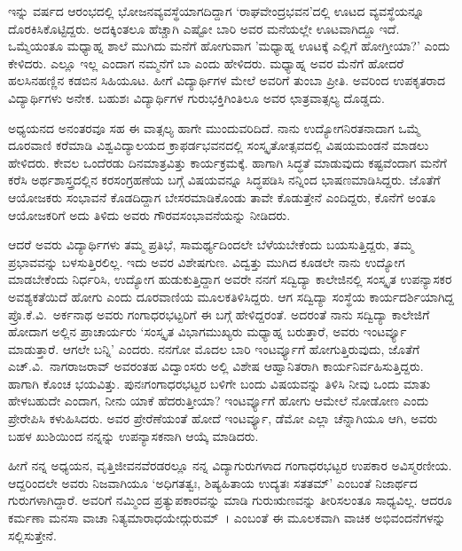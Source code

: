 {ಇನ್ನು ವರ್ಷದ ಆರಂಭದಲ್ಲಿ ಭೋಜನವ್ಯವಸ್ಥೆಯಾಗದಿದ್ದಾಗ ‘ರಾಘವೇಂದ್ರ\-ಭವನ’ದಲ್ಲಿ ಊಟದ ವ್ಯವಸ್ಥೆಯನ್ನೂ ದೊರಕಿಸಿಕೊಟ್ಟಿದ್ದರು. ಅದಕ್ಕಿಂತಲೂ ಹೆಚ್ಚಾಗಿ ಎಷ್ಟೋ ಬಾರಿ ಅವರ ಮನೆಯಲ್ಲೇ ಊಟವಾಗಿದ್ದೂ ಇದೆ. ಒಮ್ಮೆಯಂತೂ ಮಧ್ಯಾಹ್ನ ಶಾಲೆ ಮುಗಿದು ಮನೆಗೆ ಹೋಗುವಾಗ ’ಮಧ್ಯಾಹ್ನ ಊಟಕ್ಕೆ ಎಲ್ಲಿಗೆ ಹೋಗ್ತೀಯಾ?’ ಎಂದು ಕೇಳಿದರು. ಎಲ್ಲೂ ಇಲ್ಲ ಎಂದಾಗ ನಮ್ಮನೆಗೆ ಬಾ ಎಂದು ಹೇಳಿದರು. ಮಧ್ಯಾಹ್ನ ಅವರ ಮೆನೆಗೆ ಹೋದರೆ ಹಲಸಿನಹಣ್ಣಿನ ಕಡಬಿನ ಸಿಹಿಯೂಟ. ಹೀಗೆ ವಿದ್ಯಾರ್ಥಿಗಳ ಮೇಲೆ ಅವರಿಗೆ ತುಂಬಾ ಪ್ರೀತಿ. ಅವರಿಂದ ಉಪಕೃತರಾದ ವಿದ್ಯಾರ್ಥಿಗಳು ಅನೇಕ. ಬಹುಶಃ ವಿದ್ಯಾರ್ಥಿಗಳ ಗುರುಭಕ್ತಿಗಿಂತಿಲೂ ಅವರ ಛಾತ್ರವಾತ್ಸಲ್ಯ ದೊಡ್ಡದು.

ಅಧ್ಯಯನದ ಅನಂತರವೂ ಸಹ ಈ ವಾತ್ಸಲ್ಯ ಹಾಗೇ ಮುಂದುವರಿದಿದೆ. ನಾನು ಉದ್ಯೋಗನಿರತನಾದಾಗ ಒಮ್ಮೆ ದೂರವಾಣಿ ಕರೆಮಾಡಿ ವಿಶ್ವವಿದ್ಯಾಲಯದ ಕ್ರಾಫರ್ಡ\-ಭವನದಲ್ಲಿ ಸಂಸ್ಕೃತೋತ್ಸವದಲ್ಲಿ ವಿಷಯಮಂಡನೆ ಮಾಡಲು ಹೇಳಿದರು. ಕೇವಲ ಒಂದೆರಡು ದಿನಮಾತ್ರವಿತ್ತು ಕಾರ್ಯಕ್ರಮಕ್ಕೆ. ಹಾಗಾಗಿ ಸಿದ್ಧತೆ ಮಾಡುವುದು ಕಷ್ಟವೆಂದಾಗ ಮನೆಗೆ ಕರೆಸಿ ಅರ್ಥಶಾಸ್ತ್ರದಲ್ಲಿನ ಕರಸಂಗ್ರಹಣೆಯ ಬಗ್ಗೆ ವಿಷಯವನ್ನೂ ಸಿದ್ಧಪಡಿಸಿ ನನ್ನಿಂದ ಭಾಷಣಮಾಡಿಸಿದ್ದರು. ಜೊತೆಗೆ ಆಯೋಜಕರು ಸಂಭಾವನೆ ಕೊಡದಿದ್ದಾಗ ಬೇಸರಮಾಡಿಕೊಂಡು ತಾವೇ ಕೊಡುತ್ತೇನೆ ಎಂದಿದ್ದರು, ಕೊನೆಗೆ ಅಂತೂ ಆಯೋಜಕರಿಗೆ ಅದು ತಿಳಿದು ಅವರು ಗೌರವಸಂಭಾವನೆಯನ್ನು ನೀಡಿದರು.

ಆದರೆ ಅವರು ವಿದ್ಯಾರ್ಥಿಗಳು ತಮ್ಮ ಪ್ರತಿಭೆ, ಸಾಮರ್ಥ್ಯದಿಂದಲೇ ಬೆಳೆಯ\-ಬೇಕೆಂದು ಬಯಸುತ್ತಿದ್ದರು, ತಮ್ಮ ಪ್ರಭಾವವನ್ನು ಬಳಸುತ್ತಿರಲಿಲ್ಲ. ಇದು ಅವರ ವಿಶೇಷ\-ಗುಣ. ವಿದ್ವತ್ತು ಮುಗಿದ ಕೂಡಲೇ ನಾನು ಉದ್ಯೋಗ ಮಾಡಬೇಕೆಂದು ನಿರ್ಧರಿಸಿ, ಉದ್ಯೋಗ ಹುಡುಕುತ್ತಿದ್ದಾಗ ಅವರೇ ನನಗೆ ಸದ್ವಿದ್ಯಾ ಕಾಲೇಜಿನಲ್ಲಿ ಸಂಸ್ಕೃತ ಉಪನ್ಯಾಸಕರ ಅವಶ್ಯಕತೆಯಿದೆ ಹೋಗು ಎಂದು ದೂರವಾಣಿಯ ಮೂಲಕ\break ತಿಳಿಸಿದ್ದರು. ಆಗ ಸದ್ವಿದ್ಯಾ ಸಂಸ್ಥೆಯ ಕಾರ್ಯದರ್ಶಿಯಾಗಿದ್ದ ಪ್ರೊ.ಕೆ.ವಿ.\ ಅರ್ಕನಾಥ ಅವರು ಗಂಗಾಧರಭಟ್ಟರಿಗೆ ಈ ಬಗ್ಗೆ ಹೇಳಿದ್ದರಂತೆ. ಅದರಂತೆ ನಾನು ಸದ್ವಿದ್ಯಾ ಕಾಲೇಜಿಗೆ ಹೋದಾಗ ಅಲ್ಲಿನ ಪ್ರಾಚಾರ್ಯರು ‘ಸಂಸ್ಕೃತ ವಿಭಾಗಮುಖ್ಯರು ಮಧ್ಯಾಹ್ನ ಬರುತ್ತಾರೆ, ಅವರು ಇಂಟರ್ವ್ಯೂ ಮಾಡುತ್ತಾರೆ. ಆಗಲೇ ಬನ್ನಿ’ ಎಂದರು. ನನಗೋ ಮೊದಲ ಬಾರಿ ಇಂಟರ್ವ್ಯೂಗೆ ಹೋಗುತ್ತಿರುವುದು, ಜೊತೆಗೆ ಎಚ್.ವಿ.\ ನಾಗರಾಜರಾವ್ ಅವರಂತಹ ವಿದ್ವಾಂಸರು ಅಲ್ಲಿ ವಿಶೇಷ ಆಹ್ವಾನಿತರಾಗಿ ಕಾರ್ಯನಿರ್ವಹಿಸುತ್ತಿದ್ದರು. ಹಾಗಾಗಿ ಕೊಂಚ ಭಯವಿತ್ತು. ಪುನಃಗಂಗಾಧರಭಟ್ಟರ ಬಳಿಗೇ ಬಂದು ವಿಷಯವನ್ನು ತಿಳಿಸಿ ನೀವು ಒಂದು ಮಾತು ಹೇಳಬಹುದೇ ಎಂದಾಗ, ನೀನು ಯಾಕೆ ಹೆದರುತ್ತೀಯಾ? ಇಂಟರ್ವ್ಯೂಗೆ ಹೋಗು ಆಮೇಲೆ ನೋಡೋಣ ಎಂದು ಪ್ರೇರೇಪಿಸಿ ಕಳುಹಿಸಿದರು. ಅವರ ಪ್ರೇರೆಣೆಯಂತೆ ಹೋದೆ ಇಂಟರ್ವ್ಯೂ, ಡೆಮೋ ಎಲ್ಲಾ ಚೆನ್ನಾಗಿಯೂ ಆಗಿ, ಅವರು ಬಹಳ ಖುಶಿಯಿಂದ ನನ್ನನ್ನು ಉಪನ್ಯಾಸಕನಾಗಿ ಆಯ್ಕೆ ಮಾಡಿದರು.

ಹೀಗೆ ನನ್ನ ಅಧ್ಯಯನ, ವೃತ್ತಿಜೀವನವೆರಡರಲ್ಲೂ ನನ್ನ ವಿದ್ಯಾಗುರುಗಳಾದ ಗಂಗಾಧರಭಟ್ಟರ ಉಪಕಾರ ಅವಿಸ್ಮರಣೀಯ. ಆದ್ದರಿಂದಲೇ ಅವರು ನಿಜವಾಗಿಯೂ ‘ಅಧಿಗತತ್ವಃ, ಶಿಷ್ಯಹಿತಾಯ ಉದ್ಯತಃ ಸತತಮ್’ ಎಂಬಂತೆ ನಿಜಾರ್ಥದ ಗುರುಗಳಾಗಿದ್ದಾರೆ. ಅವರಿಗೆ ನಮ್ಮಿಂದ ಪ್ರತ್ಯುಪಕಾರವನ್ನು ಮಾಡಿ ಗುರುಋಣವನ್ನು ತೀರಿಸಲಂತೂ ಸಾಧ್ಯವಿಲ್ಲ. ಆದರೂ ಕರ್ಮಣಾ ಮನಸಾ ವಾಚಾ ನಿತ್ಯಮಾರಾಧಯೇದ್ಗುರುಮ್~। ಎಂಬಂತೆ ಈ ಮೂಲಕವಾಗಿ ವಾಚಿಕ ಅಭಿವಂದನೆಗಳನ್ನು ಸಲ್ಲಿಸುತ್ತೇನೆ.

\articleend
}
